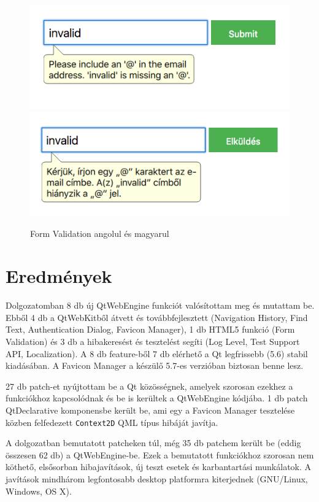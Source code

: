 \documentclass[12pt]{report}
\begin{document}
\begin{figure}[H]
    \centering
    \includegraphics[scale=0.6]{validation-message-english}
    \includegraphics[scale=0.6]{validation-message-magyar}
    \caption{
        \label{fig:validation-message-localization}
        Form Validation angolul és magyarul
    }
\end{figure}


\chapter*{Eredmények}

Dolgozatomban 8 db új QtWebEngine funkciót valósítottam meg és mutattam be. Ebből 4 db a
QtWebKitből átvett és továbbfejlesztett (Navigation History, Find Text, Authentication
Dialog, Favicon Manager), 1 db HTML5 funkció (Form Validation) és 3 db a hibakeresést és
tesztelést segíti (Log Level, Test Support API, Localization). A 8 db feature-ből 7 db
elérhető a Qt legfrissebb (5.6) stabil kiadásában. A Favicon Manager a készülő 5.7-es
verzióban biztosan benne lesz.

27 db patch-et nyújtottam be a Qt közösségnek, amelyek szorosan ezekhez a funkciókhoz
kapcsolódnak és be is kerültek a QtWebEngine kódjába. 1 db patch QtDeclarative komponensbe
került be, ami egy a Favicon Manager tesztelése közben felfedezett \texttt{Context2D}
QML típus hibáját javítja.

A dolgozatban bemutatott patcheken túl, még 35 db patchem került be (eddig összesen 62 db) a
QtWebEngine-be. Ezek a bemutatott funkciókhoz szorosan nem köthető, elsősorban hibajavítások,
új teszt esetek és karbantartási munkálatok. A javítások mindhárom legfontosabb desktop
platformra kiterjednek (GNU/Linux, Windows, OS X).
\end{document}
